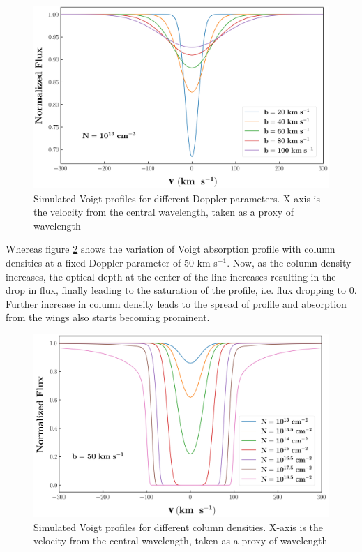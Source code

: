 \begin{figure}[!h]
    \centering
    \includegraphics[width=\linewidth]{Figures/Voigt-b.jpg}
    \caption{Simulated Voigt profiles for different Doppler parameters. X-axis is the velocity from the central wavelength, taken as a proxy of wavelength}
    \label{fig:Voigt-b}
\end{figure}

Whereas figure \ref{fig:Voigt-N} shows the variation of Voigt absorption profile with column densities at a fixed Doppler parameter of 50 km s$^{-1}$. Now, as the column density increases, the optical depth at the center of the line increases resulting in the drop in flux, finally leading to the saturation of the profile, i.e. flux dropping to 0. Further increase in column density leads to the spread of profile and absorption from the wings also starts becoming prominent.

\begin{figure}[!t]
    \centering
    \includegraphics[width=\linewidth]{Figures/Voigt-N.jpg}
    \caption{Simulated Voigt profiles for different column densities. X-axis is the velocity from the central wavelength, taken as a proxy of wavelength}
    \label{fig:Voigt-N}
\end{figure}


